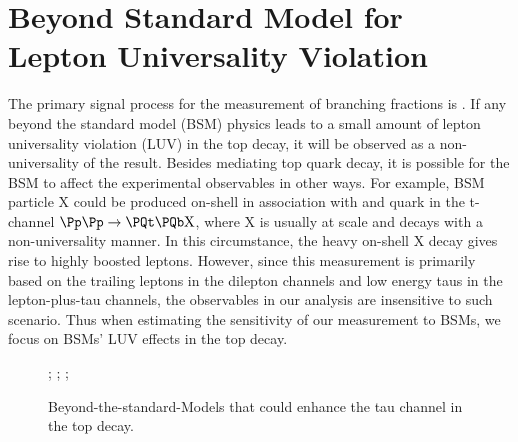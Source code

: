 

\section{Beyond Standard Model for Lepton Universality Violation}
\label{sec:relatedWorks:bsm}

The primary signal process for the measurement of \PW branching fractions is \ttbar. If any beyond the standard model (BSM) physics leads to a small amount of lepton universality violation (LUV) in the top decay, it will be observed as a non-universality of the \BWl result. Besides mediating top quark decay, it is possible for the BSM to affect the experimental observables in other ways. For example, BSM particle \textrm{X} could be produced on-shell in association with \PQt and \PQb quark in the t-channel $\Pp\Pp \to \PQt \PQb \mathrm{X}$, where \textrm{X} is usually at \TeV scale and decays with a non-universality manner. In this circumstance, the heavy on-shell \textrm{X} decay gives rise to highly boosted leptons. However, since this \BWl measurement is primarily based on the trailing leptons in the dilepton channels and low energy taus in the lepton-plus-tau channels, the observables in our analysis are insensitive to such scenario. Thus when estimating the sensitivity of our measurement to BSMs, we focus on BSMs' LUV effects in the top decay. 

\begin{figure}[ht]
    \centering
    ;\qquad
    ;\qquad
    ;
    \caption{Beyond-the-standard-Models that could enhance the tau channel in the top decay. }
   \label{fig:relatedWorks:bsm:topdecayBSM}
\end{figure}

